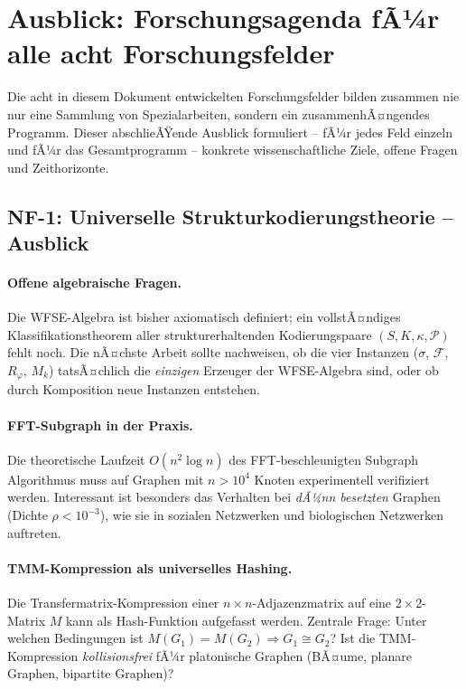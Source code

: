 ﻿\documentclass[a4paper,12pt]{scrreprt}
\theoremstyle{definition}
\begin{document}
\section*{Ausblick: Forschungsagenda fÃ¼r alle acht Forschungsfelder}
\label{sec:ausblick_all}

Die acht in diesem Dokument entwickelten Forschungsfelder bilden zusammen
nie nur eine Sammlung von Spezialarbeiten, sondern ein zusammenhÃ¤ngendes
Programm. Dieser abschlieÃŸende Ausblick formuliert -- fÃ¼r jedes Feld einzeln
und fÃ¼r das Gesamtprogramm -- konkrete wissenschaftliche Ziele, offene
Fragen und Zeithorizonte.

\subsection*{NF-1: Universelle Strukturkodierungstheorie -- Ausblick}

\paragraph{Offene algebraische Fragen.}
Die WFSE-Algebra ist bisher axiomatisch definiert; ein vollstÃ¤ndiges
Klassifikationstheorem aller strukturerhaltenden Kodierungspaare
$(S, K, \kappa, \mathcal{P})$ fehlt noch. Die nÃ¤chste Arbeit sollte
nachweisen, ob die vier Instanzen ($\sigma$, $\mathcal{F}$, $R_\varphi$,
$M_k$) tatsÃ¤chlich die \emph{einzigen} Erzeuger der WFSE-Algebra sind,
oder ob durch Komposition neue Instanzen entstehen.

\paragraph{FFT-Subgraph in der Praxis.}
Die theoretische Laufzeit $O(n^2 \log n)$ des FFT-beschleu\-nigten
Subgraph Algorithmus muss auf Graphen mit $n > 10^4$ Knoten
experimentell verifiziert werden. Interessant ist besonders das
Verhalten bei \emph{dÃ¼nn besetzten} Graphen
(Dichte $\rho < 10^{-3}$), wie sie in sozialen Netzwerken und
biologischen Netzwerken auftreten.

\paragraph{TMM-Kompression als universelles Hashing.}
Die Transfermatrix-Kompression einer $n\times n$-Adjazenzmatrix
auf eine $2\times 2$-Matrix $M$ kann als Hash-Funktion aufgefasst werden.
Zentrale Frage: Unter welchen Bedingungen ist
$M(G_1) = M(G_2) \Rightarrow G_1 \cong G_2$? Ist die TMM-Kompression
\emph{kollisionsfrei} fÃ¼r platonische Graphen (BÃ¤ume, planare Graphen,
bipartite Graphen)?
\end{document}
